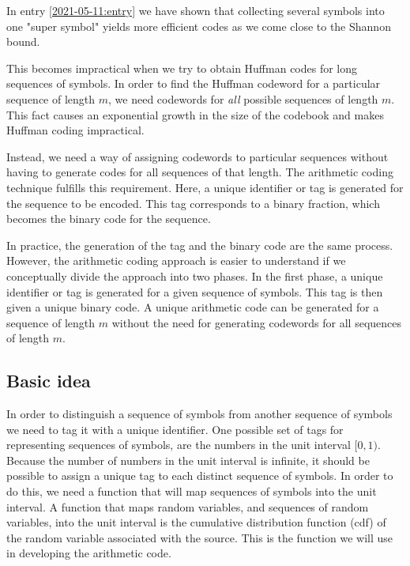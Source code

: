 
In entry \ref{2021-05-11:entry} we have shown that collecting several symbols into one "super symbol" yields more efficient codes as we come close to the Shannon bound. 

This becomes impractical when we try to obtain Huffman codes for long sequences of symbols. In order to find the Huffman codeword for a particular sequence of length $m$, we need codewords for \emph{all} possible sequences of length $m$. This fact causes an exponential growth in the size of the codebook and makes Huffman coding impractical.

Instead, we need a way of assigning codewords to particular sequences without having to generate codes for all sequences of that length. The arithmetic coding technique fulfills this requirement. Here, a unique identifier or tag is generated for the sequence to be encoded. This tag corresponds to a binary fraction, which becomes the binary code for the sequence.

In practice, the generation of the tag and the binary code are the same process. However, the arithmetic coding approach is easier to understand if we conceptually divide the approach into two phases. In the first phase, a unique identifier or tag is generated for a given sequence of symbols. This tag is then given a unique binary code. A unique arithmetic code can be generated for a sequence of length $m$ without the need for generating codewords for all sequences of length $m$.

\subsection{Basic idea}

In order to distinguish a sequence of symbols from another sequence of symbols we need to tag it with a unique identifier. One possible set of tags for representing sequences of symbols, are the numbers in the unit interval $[0, 1)$. Because the number of numbers in the unit interval is infinite, it should be possible to assign a unique tag to each distinct sequence of symbols. In order to do this, we need a function that will map sequences of symbols into the unit interval. A function that maps random variables, and sequences of random variables, into the unit interval is the cumulative distribution function (cdf) of the random variable associated with the source. This is the function we will use in developing the arithmetic code.

